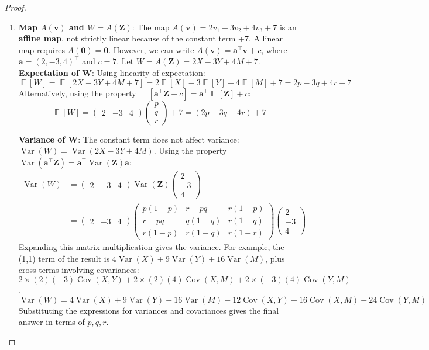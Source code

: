 \documentclass[11pt, a4paper]{article}
\DeclareMathOperator{\E}{\mathbb{E}}             %
\DeclareMathOperator{\Var}{\mathrm{Var}}         %
\DeclareMathOperator{\Cov}{\mathrm{Cov}}         %
\theoremstyle{definition}
\theoremstyle{remark}
\newcommand{\vect}[1]{\bm{#1}}          %
\newcommand{\transpose}{^{\top}}        %
\begin{document}
\begin{proof}
\begin{enumerate}[label=(\alph*)]
    \item \textbf{Map $A(\vect{v})$ and $W = A(\vect{Z})$}:
    The map $A(\vect{v}) = 2v_1 - 3v_2 + 4v_3 + 7$ is an \textbf{affine map}, not strictly linear because of the constant term +7. A linear map requires $A(\vect{0}) = \vect{0}$. However, we can write $A(\vect{v}) = \vect{a}\transpose \vect{v} + c$, where $\vect{a} = (2, -3, 4)\transpose$ and $c = 7$.
    Let $W = A(\vect{Z}) = 2X - 3Y + 4M + 7$.
    \textbf{Expectation of W}:
    Using linearity of expectation:
    \[ \E[W] = \E[2X - 3Y + 4M + 7] = 2\E[X] - 3\E[Y] + 4\E[M] + 7 = 2p - 3q + 4r + 7 \]
    Alternatively, using the property $\E[\vect{a}\transpose \vect{Z} + c] = \vect{a}\transpose \E[\vect{Z}] + c$:
    \[ \E[W] = \begin{pmatrix} 2 & -3 & 4 \end{pmatrix} \begin{pmatrix} p \\ q \\ r \end{pmatrix} + 7 = (2p - 3q + 4r) + 7 \]

    \textbf{Variance of W}:
    The constant term does not affect variance: $\Var(W) = \Var(2X - 3Y + 4M)$.
    Using the property $\Var(\vect{a}\transpose \vect{Z}) = \vect{a}\transpose \Var(\vect{Z}) \vect{a}$:
    \begin{align*} \Var(W) &= \begin{pmatrix} 2 & -3 & 4 \end{pmatrix} \Var(\vect{Z}) \begin{pmatrix} 2 \\ -3 \\ 4 \end{pmatrix} \\ &= \begin{pmatrix} 2 & -3 & 4 \end{pmatrix} \begin{pmatrix} p(1-p) & r - pq & r(1-p) \\ r - pq & q(1-q) & r(1-q) \\ r(1-p) & r(1-q) & r(1-r) \end{pmatrix} \begin{pmatrix} 2 \\ -3 \\ 4 \end{pmatrix} \end{align*}
    Expanding this matrix multiplication gives the variance. For example, the (1,1) term of the result is $4 \Var(X) + 9 \Var(Y) + 16 \Var(M)$, plus cross-terms involving covariances: $2 \times (2)(-3) \Cov(X,Y) + 2 \times (2)(4) \Cov(X,M) + 2 \times (-3)(4) \Cov(Y,M)$.
    \[ \Var(W) = 4\Var(X) + 9\Var(Y) + 16\Var(M) - 12\Cov(X,Y) + 16\Cov(X,M) - 24\Cov(Y,M) \]
    Substituting the expressions for variances and covariances gives the final answer in terms of $p, q, r$.


\end{enumerate}
\end{proof}
\end{document}

